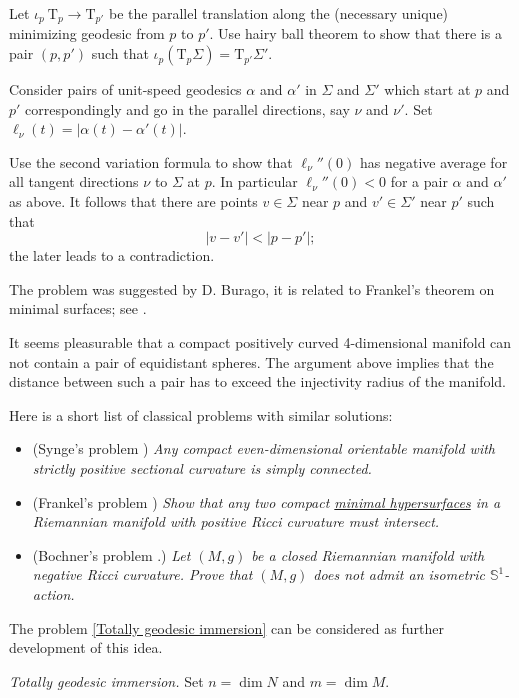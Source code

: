 Let $\iota_p\:\mathrm{T}_p\to\mathrm{T}_{p'}$ be the parallel translation along the (necessary unique) minimizing geodesic from $p$ to $p'$.
Use hairy ball theorem 
to show that there is a pair $(p,p')$ such that $\iota_p(\mathrm{T}_p\Sigma)=\mathrm{T}_{p'}\Sigma'$.

Consider pairs of unit-speed geodesics $\alpha$ and $\alpha'$ 
in $\Sigma$ and $\Sigma'$  
which start at $p$ and $p'$ correspondingly
and go in the parallel directions, say $\nu$ and $\nu'$. 
Set $\ell_\nu(t)=|\alpha(t)-\alpha'(t)|$.

Use the second variation formula to show that $\ell_\nu''(0)$ has negative average for all tangent directions $\nu$ to $\Sigma$ at $p$. 
In particular $\ell_\nu''(0)<0$ for a pair $\alpha$ and $\alpha'$ as above.
It follows that there are points $v\in\Sigma$ near $p$ 
and $v'\in\Sigma'$ near $p'$
such that 
\[|v-v'|<|p-p'|;\]
the later leads to a contradiction.

The problem was suggested by D. Burago,
it is related to Frankel's theorem on minimal surfaces; 
see \cite{frankel}.

It seems pleasurable that a 
compact 
positively curved 
4-dimensional manifold
can not contain a pair of equidistant spheres.
The argument above implies that the distance between such a pair has to exceed the injectivity radius of the manifold.

Here is a short list of classical problems with similar solutions:
\begin{itemize}
\item (Synge's problem \cite{synge})
{\it Any compact even-dimensional orientable manifold with strictly positive sectional curvature is
simply connected.}
\item (Frankel's problem \cite{frankel})
{\it Show that any two compact \hyperref[Minimal surface]{\emph{minimal hypersurfaces}} in a Riemannian manifold with positive Ricci curvature must intersect.}
\item (Bochner's problem \cite{bochner}.)
{\it  Let $(M,g)$ be a closed Riemannian manifold with negative Ricci curvature.
Prove that $(M,g)$ does not admit an isometric $\mathbb{S}^1$-action.}
\end{itemize}
The problem \ref{Totally geodesic immersion} can be considered as further development of this idea.




\textit{Totally geodesic immersion.}
Set $n=\dim N$ and $m=\dim M$.

